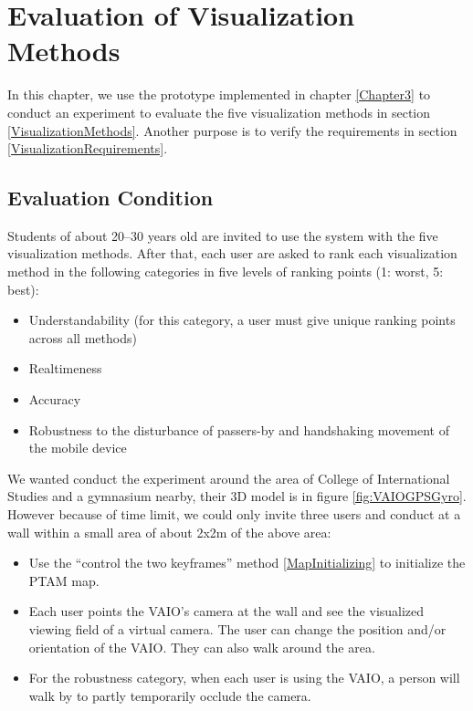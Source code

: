 \chapter{Evaluation of Visualization Methods}
\label{Chapter4}

In this chapter, we use the prototype implemented in chapter \ref{Chapter3} to conduct an experiment to evaluate the five visualization methods in section \ref{VisualizationMethods}. Another purpose is to verify the requirements in section \ref{VisualizationRequirements}.


\section{Evaluation Condition}

Students of about 20--30 years old are invited to use the system with the five visualization methods. After that, each user are asked to rank each visualization method in the following categories in five levels of ranking points (1: worst, 5: best):

\begin{itemize}
	\item Understandability (for this category, a user must give unique ranking points across all methods)
	\item Realtimeness
	\item Accuracy
	\item Robustness to the disturbance of passers-by and handshaking movement of the mobile device
\end{itemize}

We wanted conduct the experiment around the area of College of International Studies and a gymnasium nearby, their 3D model is in figure \ref{fig:VAIOGPSGyro}. However because of time limit, we could only invite three users and conduct at a wall within a small area of about 2x2m of the above area:

\begin{itemize}
	\item Use the ``control the two keyframes'' method \ref{MapInitializing} to initialize the PTAM map.
	\item Each user points the VAIO's camera at the wall and see the visualized viewing field of a virtual camera. The user can change the position and/or orientation of the VAIO. They can also walk around the area.
	\item For the robustness category, when each user is using the VAIO, a person will walk by to partly temporarily occlude the camera.
\end{itemize}

